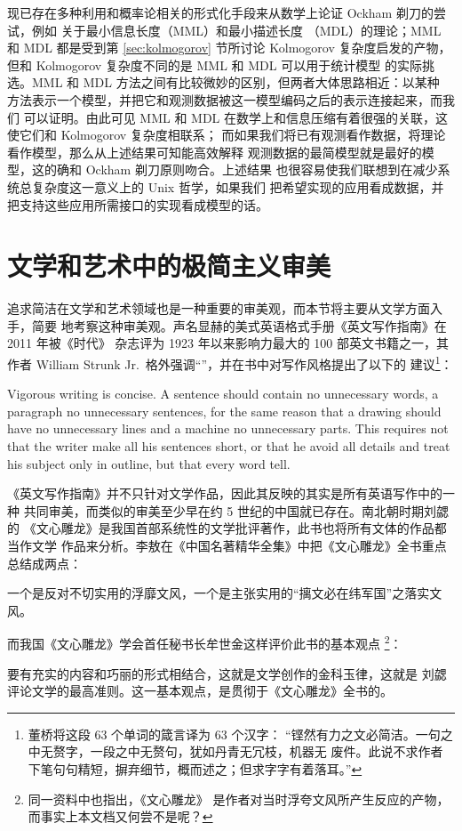 现已存在多种利用和概率论相关的形式化手段来从数学上论证 Ockham 剃刀的尝试，例如
关于最小信息长度（MML）和最小描述长度%
（MDL）的理论；MML 和 MDL 都是受到第 \ref{sec:kolmogorov} 节所讨论 Kolmogorov
复杂度启发的产物，但和 Kolmogorov 复杂度不同的是 MML 和 MDL 可以用于统计模型
的实际挑选。MML 和 MDL 方法之间有比较微妙的区别，但两者大体思路相近：以某种
方法表示一个模型，并把它和观测数据被这一模型编码之后的表示连接起来，而我们
可以证明。由此可见 MML 和
MDL 在数学上和信息压缩有着很强的关联，这使它们和 Kolmogorov 复杂度相联系；
而如果我们将已有观测看作数据，将理论看作模型，那么从上述结果可知能高效解释
观测数据的最简模型就是最好的模型，这的确和 Ockham 剃刀原则吻合。上述结果
也很容易使我们联想到在减少系统总复杂度这一意义上的 Unix 哲学，如果我们
把希望实现的应用看成数据，并把支持这些应用所需接口的实现看成模型的话。

\section{文学和艺术中的极简主义审美}\label{sec:art}

追求简洁在文学和艺术领域也是一种重要的审美观，而本节将主要从文学方面入手，简要
地考察这种审美观。声名显赫的美式英语格式手册《英文写作指南》在 2011 年被《时代》
杂志评为 1923 年以来影响力最大的 100 部英文书籍之一，其作者 William Strunk
Jr.\ 格外强调“”，并在书中对写作风格提出了以下的
建议\footnote{董桥将这段 63 个单词的箴言译为 63 个汉字：
“铿然有力之文必简洁。一句之中无赘字，一段之中无赘句，犹如丹青无冗枝，机器无
废件。此说不求作者下笔句句精短，摒弃细节，概而述之；但求字字有着落耳。”}：
\begin{quoting}
	Vigorous writing is concise.  A sentence should contain no
	unnecessary words, a paragraph no unnecessary sentences, for the
	same reason that a drawing should have no unnecessary lines and
	a machine no unnecessary parts.  This requires not that the writer
	make all his sentences short, or that he avoid all details and
	treat his subject only in outline, but that every word tell.
\end{quoting}

《英文写作指南》并不只针对文学作品，因此其反映的其实是所有英语写作中的一种
共同审美，而类似的审美至少早在约 5 世纪的中国就已存在。南北朝时期刘勰的
《文心雕龙》是我国首部系统性的文学批评著作，此书也将所有文体的作品都当作文学
作品来分析。李敖在《中国名著精华全集》中把《文心雕龙》全书重点总结成两点：
\begin{quoting}
	一个是反对不切实用的浮靡文风，一个是主张实用的“摛文必在纬军国”之落实文风。
\end{quoting}
而我国《文心雕龙》学会首任秘书长牟世金这样评价此书的基本观点%
\footnote{同一资料中也指出，《文心雕龙》
是作者对当时浮夸文风所产生反应的产物，而事实上本文档又何尝不是呢？}：
\begin{quoting}
	要有充实的内容和巧丽的形式相结合，这就是文学创作的金科玉律，这就是
	刘勰评论文学的最高准则。这一基本观点，是贯彻于《文心雕龙》全书的。
\end{quoting}

